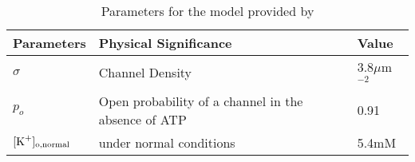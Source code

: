 \documentclass[../thesis-main.tex]{subfiles}
\begin{document}
 \begin{table}
  \begin{center}
   \begin{tabular}{lll}
   Parameters	& Physical Significance	& Value \\
   \hline
   \hline
    $\sigma$	& Channel Density	& 3.8$\mu$m$^{-2}$ \\
    $p_o$	& Open probability of a channel in the absence of ATP	& 0.91 \\
    $[\textnormal{K}^+]_\textnormal{o,normal}$ & \ko{} under normal conditions & 5.4mM \\
   \end{tabular}
  \end{center}
  \caption{Parameters for the \ikatp{} model provided by \citet{Ferrero1996}}
  \label{table:ferrero1996}
 \end{table}

 
 \biblio
\end{document}
